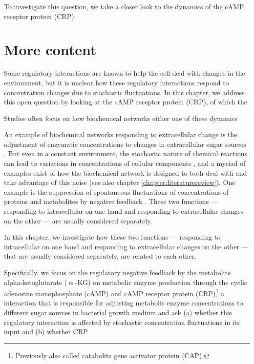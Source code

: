 To investigate this question, we take a closer look to the dynamics of the cAMP receptor protein (CRP).


\section{More content}

Some regulatory interactions are known to help the cell deal with changes in the environment, but it is unclear how these regulatory interactions respond to concentration changes due to stochastic fluctuations.
%
In this chapter, we address this open question by looking at the cAMP receptor protein (CRP), of which the 


Studies often focus on how biochemical networks either one of these dynamics


%
An example of biochemical networks responding to extracellular change is the adjustment of enzymatic concentrations to changes in extracellular sugar sources \cite{Towbin2017}.
But even in a constant environment, the stochastic nature of chemical reactions can lead to variations in concentrations of cellular components  \cite{Elowitz2002,Kiviet2014}, 
and a myriad of examples exist of how the biochemical network is designed to both deal with and take advantage of this noise (see also chapter \ref{chapter:literaturereview}).
One example is the suppression of spontaneous fluctuations of concentrations of proteins and metabolites by negative feedback \cite{Brandman2008, Lestas2010, Bowsher2013}.
%
These two functions --- responding to intracellular on one hand and responding to extracellular changes on the other --- are usually considered separately.

In this chapter, we investigate how these two functions --- responding to intracellular on one hand and responding to extracellular changes on the other --- that are usually considered separately, are related to each other.


Specifically, we focus on the regulatory negative feedback by the metabolite alpha-ketoglutarate ($\upalpha$-KG) on metabolic enzyme production through the cyclic adenosine monophosphate (cAMP) and cAMP receptor protein (CRP)\footnote{Previously also called catabolite gene activator protein (CAP).} a interaction that is responsible for adjusting metabolic enzyme concentrations to different sugar sources in bacterial growth medium \cite{Towbin2017, Doucette2011, You2013} and ask (a) whether this regulatory interaction is affected by stochastic concentration fluctuations in its input and (b) whether CRP 
%


